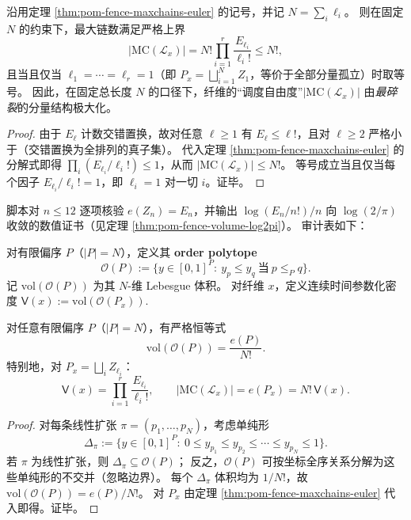 \begin{corollary}\label{cor:pom-fence-maxchains-all-isolated-optimal}
沿用定理 \ref{thm:pom-fence-maxchains-euler} 的记号，并记 \(N=\sum_i \ell_i\)。
则在固定 \(N\) 的约束下，最大链数满足严格上界
\[
|\mathrm{MC}(\mathcal L_x)|
=
N!\prod_{i=1}^r \frac{E_{\ell_i}}{\ell_i!}
\le
N!,
\]
且当且仅当 \(\ell_1=\cdots=\ell_r=1\)（即 \(P_x=\bigsqcup_{i=1}^{N} Z_1\)，等价于全部分量孤立）时取等号。
因此，在固定总长度 \(N\) 的口径下，纤维的“调度自由度”\(|\mathrm{MC}(\mathcal L_x)|\) 由\emph{最碎裂}的分量结构极大化。
\end{corollary}
\begin{proof}
由于 \(E_\ell\) 计数交错置换，故对任意 \(\ell\ge 1\) 有 \(E_\ell\le \ell!\)，且对 \(\ell\ge 2\) 严格小于（交错置换为全排列的真子集）。
代入定理 \ref{thm:pom-fence-maxchains-euler} 的分解式即得
\(
\prod_i(E_{\ell_i}/\ell_i!)\le 1
\)，从而 \(|\mathrm{MC}(\mathcal L_x)|\le N!\)。
等号成立当且仅当每个因子 \(E_{\ell_i}/\ell_i!=1\)，即 \(\ell_i=1\) 对一切 \(i\)。证毕。
\end{proof}

\begin{remark}[有限窗审计：\(e(Z_n)=E_n\) 与体积常数]\label{rem:pom-fence-euler-volume-audit}
脚本对 \(n\le 12\) 逐项核验 \(e(Z_n)=E_n\)，并输出 \(\log(E_n/n!)/n\) 向 \(\log(2/\pi)\) 收敛的数值证书（见定理 \ref{thm:pom-fence-volume-log2pi}）。
审计表如下：

\end{remark}

\begin{definition}\label{def:pom-order-polytope-volume}
对有限偏序 \(P\)（\(|P|=N\)），定义其 \textbf{order polytope}
\[
\mathcal O(P):=\{y\in[0,1]^P:\ y_p\le y_q\ \text{当}\ p\le_P q\}.
\]
记 \(\mathrm{vol}(\mathcal O(P))\) 为其 \(N\)-维 Lebesgue 体积。
对纤维 \(x\)，定义连续时间参数化密度
\(
\mathsf V(x):=\mathrm{vol}(\mathcal O(P_x)).
\)
\end{definition}

\begin{theorem}[离散—连续同一性：线性扩张数 = 归一化体积]\label{thm:pom-order-polytope-volume-linext}
对任意有限偏序 \(P\)（\(|P|=N\)），有严格恒等式
\[
\mathrm{vol}(\mathcal O(P))=\frac{e(P)}{N!}.
\]
特别地，对 \(P_x=\bigsqcup_i Z_{\ell_i}\)：
\[
\mathsf V(x)=\prod_{i=1}^r \frac{E_{\ell_i}}{\ell_i!},
\qquad
|\mathrm{MC}(\mathcal L_x)|=e(P_x)=N!\,\mathsf V(x).
\]
\end{theorem}
\begin{proof}
对每条线性扩张 \(\pi=(p_1,\dots,p_N)\)，考虑单纯形
\[
\Delta_\pi:=\{y\in[0,1]^P:\ 0\le y_{p_1}\le y_{p_2}\le\cdots\le y_{p_N}\le 1\}.
\]
若 \(\pi\) 为线性扩张，则 \(\Delta_\pi\subseteq \mathcal O(P)\)；
反之，\(\mathcal O(P)\) 可按坐标全序关系分解为这些单纯形的不交并（忽略边界）。
每个 \(\Delta_\pi\) 体积均为 \(1/N!\)，故 \(\mathrm{vol}(\mathcal O(P))=e(P)/N!\)。
对 \(P_x\) 由定理 \ref{thm:pom-fence-maxchains-euler} 代入即得。证毕。
\end{proof}

